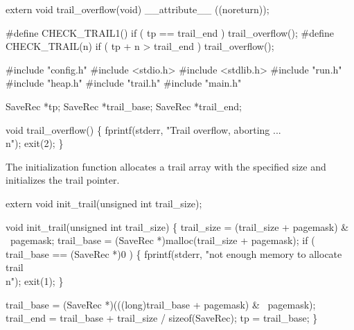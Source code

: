 extern void trail_overflow(void) __attribute__ ((noreturn));

#define CHECK_TRAIL1()  if ( tp == trail_end ) trail_overflow();
#define CHECK_TRAIL(n)  if ( tp + n > trail_end ) trail_overflow();

\nwendcode{}\nwdocspar
\nwenddocs{}\endmoddef\nwstartdeflinemarkup{}\nwenddeflinemarkup
#include "config.h"
#include <stdio.h>
#include <stdlib.h>
#include "run.h"
#include "heap.h"
#include "trail.h"
#include "main.h"

SaveRec *tp;
SaveRec *trail_base;
SaveRec *trail_end;

void
trail_overflow()
\{
    fprintf(stderr, "Trail overflow, aborting ...\\n");
    exit(2);
\}

\nwendcode{}\nwdocspar
The initialization function allocates a trail array with the specified
size and initializes the trail pointer.

\nwenddocs{}\plusendmoddef\nwstartdeflinemarkup{}\nwenddeflinemarkup
extern void init_trail(unsigned int trail_size);

\nwendcode{}\nwdocspar
\nwenddocs{}\plusendmoddef\nwstartdeflinemarkup{}\nwenddeflinemarkup
void
init_trail(unsigned int trail_size)
\{
    trail_size = (trail_size + pagemask) & ~pagemask;
    trail_base = (SaveRec *)malloc(trail_size + pagemask);
    if ( trail_base == (SaveRec *)0 )
    \{
        fprintf(stderr, "not enough memory to allocate trail\\n");
        exit(1);
    \}

    trail_base = (SaveRec *)(((long)trail_base + pagemask) & ~pagemask);
    trail_end = trail_base + trail_size / sizeof(SaveRec);
    tp        = trail_base;
\}

